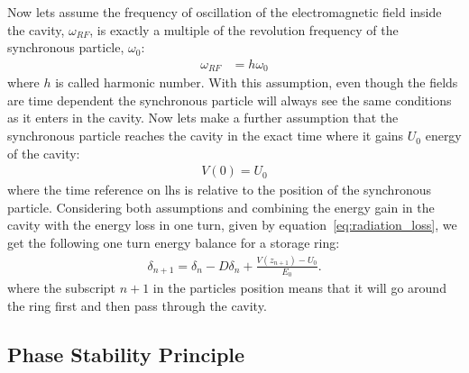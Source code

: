\documentclass[
	12pt,				%
	openright,			%
	oneside,			%
	a4paper,		%
	chapter=TITLE,		%
	section=TITLE,		%
    brazil,				%
	english,			%
	sumario=tradicional,
	]{abntex2}
\begin{document}
	Now lets assume the frequency of oscillation of the electromagnetic field inside the cavity, $\omega_{RF}$, is exactly a multiple of the revolution frequency of the synchronous particle, $\omega_0$:
	\begin{align}\label{eq:harmonic_number}
		\omega_{RF} &= h\omega_0
	\end{align}
	where $h$ is called harmonic number. With this assumption, even though the fields are time dependent the synchronous particle will always see the same conditions as it enters in the cavity. Now lets make a further assumption that the synchronous particle reaches the cavity in the exact time where it gains $U_0$ energy of the cavity:
	\begin{align}
		V(0) = U_0
	\end{align}
	where the time reference on \gls{lhs} is relative to the position of the synchronous particle. Considering both assumptions and combining the energy gain in the cavity with the energy loss in one turn, given by equation~\eqref{eq:radiation_loss}, we get the following one turn energy balance for a storage ring:
	\begin{align}\label{eq:energy_balance}
		\delta_{n+1} = \delta_n - D\delta_n + \frac{V(z_{n+1})-U_0}{E_0}.
	\end{align}
	where the subscript $n+1$ in the particles position means that it will go around the ring first and then pass through the cavity.

	\subsection{Phase Stability Principle}
\end{document}
